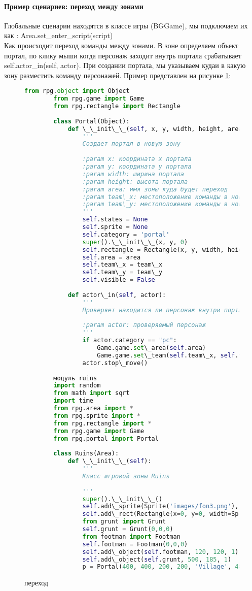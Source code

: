 \paragraph{Пример сценариев: переход между зонами}
Глобальные сценарии находятся в классе игры (BGGame), мы подключаем их как :
Area.set\_enter\_script(script)\\
Как происходит переход команды между зонами.
В зоне определяем объект портал, по клику мыши когда персонаж заходит внутрь портала срабатывает self.actor\_in(self, actor). При создании портала, мы указываем кудаи в какую зону разместить команду персонажей.
Пример представлен на рисунке \ref{portal:image}:
\begin{figure}[H]
	\begin{lstlisting}[language=Python]
		from rpg.object import Object
		from rpg.game import Game
		from rpg.rectangle import Rectangle
		
		class Portal(Object):
			def \_\_init\_\_(self, x, y, width, height, area, team\_x, team\_y):
				''' 
				Создает портал в новую зону
		
				:param x: координата x портала
				:param y: координата y портала
				:param width: ширина портала
				:param height: высота портала
				:param area: имя зоны куда будет переход
				:param team\_x: местоположение команды в новой зоне
				:param team\_y: местоположение команды в новой зоне
				'''
				self.states = None
				self.sprite = None
				self.category = 'portal'
				super().\_\_init\_\_(x, y, 0)
				self.rectangle = Rectangle(x, y, width, height)
				self.area = area
				self.team\_x = team\_x
				self.team\_y = team\_y
				self.visible = False
			
			def actor\_in(self, actor):
				'''
				Проверяет находится ли персонаж внутри портала
		
				:param actor: проверяемый персонаж
				'''
				if actor.category == "pc":
					Game.game.set\_area(self.area)
					Game.game.set\_team(self.team\_x, self.team\_y, 100)
				actor.stop\_move()
		
		модуль ruins
		import random
		from math import sqrt
		import time
		from rpg.area import *
		from rpg.sprite import *
		from rpg.rectangle import *
		from rpg.game import Game
		from rpg.portal import Portal
		
		class Ruins(Area):
			def \_\_init\_\_(self):
				'''
				Класс игровой зоны Ruins
		
				'''
				super().\_\_init\_\_()
				self.add\_sprite(Sprite('images/fon3.png'), 590, 400, 0)
				self.add\_rect(Rectangle(x=0, y=0, width=Sprite('images/fon3.png').image.width(), height=Sprite('images/fon3.png').image.height()))
				from grunt import Grunt
				self.grunt = Grunt(0,0,0)
				from footman import Footman
				self.footman = Footman(0,0,0)
				self.add\_object(self.footman, 120, 120, 1)
				self.add\_object(self.grunt, 500, 185, 1)
				p = Portal(400, 400, 200, 200, 'Village', 480, 100)
	\end{lstlisting}  
	\caption{переход}
	\label{portal:image}
\end{figure}

